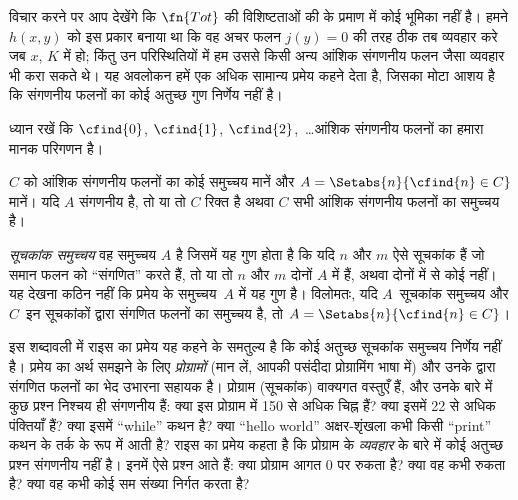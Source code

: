 \documentclass[../../../include/open-logic-section]{subfiles}
\begin{document}

विचार करने पर आप देखेंगे कि $\fn{Tot}$ की विशिष्टताओं की
 के प्रमाण में कोई भूमिका नहीं है। हमने $h(x,y)$
को इस प्रकार बनाया था कि वह अचर फलन $j(y) = 0$ की तरह ठीक तब व्यवहार
करे जब $x$, $K$ में हो; किंतु उन परिस्थितियों में हम उससे किसी
अन्य आंशिक संगणनीय फलन जैसा व्यवहार भी करा सकते थे। यह अवलोकन हमें एक
अधिक सामान्य प्रमेय कहने देता है, जिसका मोटा आशय है कि संगणनीय फलनों का
कोई अतुच्छ गुण निर्णेय नहीं है।

ध्यान रखें कि $\cfind{0}$, $\cfind{1}$, $\cfind{2}$,~\dots आंशिक
संगणनीय फलनों का हमारा मानक परिगणन है।

\begin{thm}[राइस का प्रमेय]
  $C$ को आंशिक संगणनीय फलनों का कोई समुच्चय मानें और $A =
  \Setabs{n}{\cfind{n} \in C}$ मानें। यदि $A$ संगणनीय है, तो या तो $C$
  रिक्त है अथवा $C$ सभी आंशिक संगणनीय फलनों का समुच्चय है।
\end{thm}

{\em सूचकांक समुच्चय} वह समुच्चय $A$ है जिसमें यह गुण होता है कि यदि
$n$ और $m$ ऐसे सूचकांक हैं जो समान फलन को ``संगणित'' करते हैं, तो या तो
$n$ और $m$ दोनों $A$ में हैं, अथवा दोनों में से कोई नहीं। यह देखना कठिन
नहीं कि प्रमेय के समुच्चय~$A$ में यह गुण है। विलोमतः, यदि $A$~सूचकांक
समुच्चय और $C$~इन सूचकांकों द्वारा संगणित फलनों का समुच्चय है, तो
$A = \Setabs{n}{\cfind{n} \in C}$।

\begin{explain}
इस शब्दावली में राइस का प्रमेय यह कहने के समतुल्य है कि कोई अतुच्छ
सूचकांक समुच्चय निर्णेय नहीं है। प्रमेय का अर्थ समझने के लिए
\emph{प्रोग्रामों} (मान लें, आपकी पसंदीदा प्रोग्रामिंग भाषा में) और उनके
द्वारा संगणित फलनों का भेद उभारना सहायक है। प्रोग्राम (सूचकांक) वाक्यगत
वस्तुएँ हैं, और उनके बारे में कुछ प्रश्न निश्चय ही संगणनीय हैं: क्या इस
प्रोग्राम में 150 से अधिक चिह्न हैं? क्या इसमें 22 से अधिक पंक्तियाँ हैं?
क्या इसमें ``while'' कथन है? क्या ``hello world'' अक्षर-शृंखला कभी किसी
``print'' कथन के तर्क के रूप में आती है? राइस का प्रमेय कहता है कि
प्रोग्राम के \emph{व्यवहार} के बारे में कोई अतुच्छ प्रश्न संगणनीय नहीं
है। इनमें ऐसे प्रश्न आते हैं: क्या प्रोग्राम आगत $0$ पर रुकता है? क्या
वह कभी रुकता है? क्या वह कभी कोई सम संख्या निर्गत करता है?
\end{explain}
\end{document}
